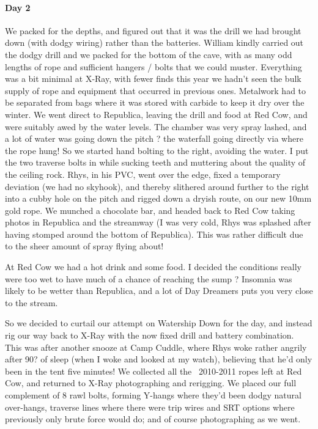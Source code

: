 \paragraph{Day 2}
We packed for the depths, and figured out that it was the drill we had brought down (with dodgy wiring) rather than the batteries. William kindly carried out the dodgy drill and we packed for the bottom of the cave, with as many odd lengths of rope and sufficient hangers / bolts that we could muster. Everything was a bit minimal at X-Ray, with fewer finds this year we hadn't seen the bulk supply of rope and equipment that occurred in previous ones. Metalwork had to be separated from bags where it was stored with carbide to keep it dry over the winter.
We went direct to Republica, leaving the drill and food at Red Cow, and were suitably awed by the water levels. The chamber was very spray lashed, and a lot of water was going down the pitch ? the waterfall going directly via where the rope hung!
So we started hand bolting to the right, avoiding the water. I put the two traverse bolts in while sucking teeth and muttering about the quality of the ceiling rock. Rhys, in his PVC, went over the edge, fixed a temporary deviation (we had no skyhook), and thereby slithered around further to the right into a cubby hole on the pitch and rigged down a dryish route, on our new 10mm gold rope. We munched a chocolate bar, and headed back to Red Cow taking photos in Republica and the streamway (I was very cold, Rhys was splashed after having stomped around the bottom of Republica). This was rather difficult due to the sheer amount of spray flying about!

At Red Cow we had a hot drink and some food. I decided the conditions really were too wet to have much of a chance of reaching the sump ? Insomnia was likely to be wetter than Republica, and a lot of Day Dreamers puts you very close to the stream.

So we decided to curtail our attempt on Watership Down for the day, and instead rig our way back to X-Ray with the now fixed drill and battery combination. This was after another snooze at Camp Cuddle, where Rhys woke rather angrily after 90? of sleep (when I woke and looked at my watch), believing that he'd only been in the tent five minutes!
We collected all the ~2010-2011 ropes left at Red Cow, and returned to X-Ray photographing and rerigging. We placed our full complement of 8 rawl bolts, forming Y-hangs where they'd been dodgy natural over-hangs, traverse lines where there were trip wires and SRT options where previously only brute force would do; and of course photographing as we went.


